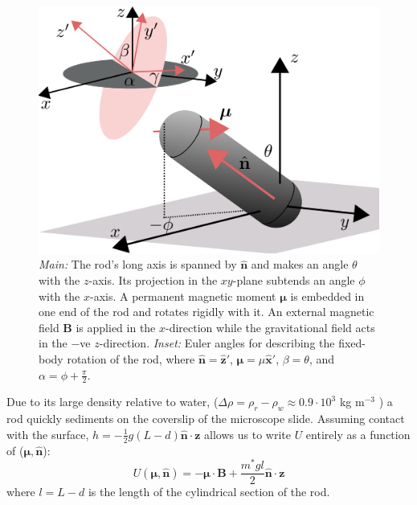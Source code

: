 \documentclass[aps,prl,reprint,twocolumn,superscriptaddress,showpacs]{revtex4-1}
\newcommand{\vcrm}[1]{\mathbf{#1}}
\newcommand{\hvcrm}[1]{\mathbf{\hat{#1}}}
\newcommand{\vc}[1]{\boldsymbol{#1}}
\begin{document}
\begin{figure}
		\includegraphics[width=0.95\columnwidth]{figs/geometry2.pdf}
	\caption{\footnotesize \emph{Main:} The rod's long axis is spanned by $\hvcrm{n}$ and makes an angle $\theta$ with the $z$-axis. Its projection in the $xy$-plane subtends an angle $\phi$ with the $x$-axis. A permanent magnetic moment $\vc{\mu}$ is embedded in one end of the rod and rotates rigidly with it. An external magnetic field $\vcrm{B}$ is applied in the $x$-direction while the gravitational field acts in the $-$ve $z$-direction. \emph{Inset:} Euler angles for describing the fixed-body rotation of the rod, where $\hvcrm{n}=\hvcrm{z}'$, $\vc{\mu}=\mu\hvcrm{x}'$, $\beta=\theta$, and $\alpha=\phi+\frac{\pi}{2}$.\label{fig:geometry}}
\end{figure}


Due to its large density relative to water, ($\Delta\rho = \rho_r - \rho_w \approx 0.9 \cdot 10^3$ kg m$^{-3}$ \cite{Kuijk2011}) a rod quickly sediments on the coverslip of the microscope slide. Assuming contact with the surface, $h=-\frac{1}{2}g(L-d)\hvcrm{n}\cdot\vc{z}$ allows us to write $U$ entirely as a function of ($\vc{\mu},\hvcrm{n}$):\begin{equation}\label{energy}
U(\vc{\mu},\hvcrm{n})= -\vc{\mu}\cdot\vcrm{B} + \frac{m^* g l}{2}  \hvcrm{n}\cdot\vc{z}
\end{equation}where $l=L-d$ is the length of the cylindrical section of the rod.
\end{document}

